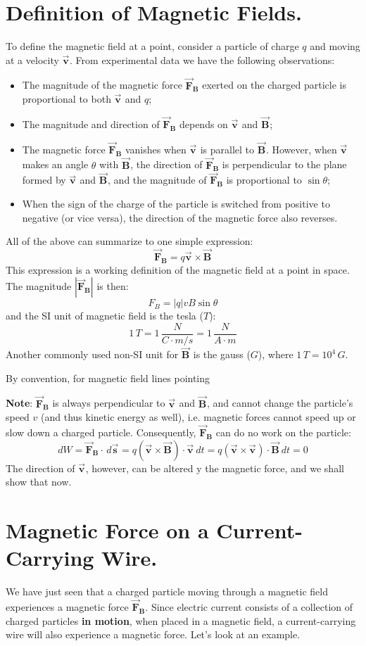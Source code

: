 \documentclass[11pt, letterpaper]{article}
\theoremstyle{definition}
\theoremstyle{remark}
\newcommand{\bv}[2][]{\bm{\vec{#2}_{#1}}}
\begin{document}
\section{Definition of Magnetic Fields.}
To define the magnetic field at a point, consider a particle of charge $q$ and moving at a velocity $\bv{v}$. From experimental data we have the following observations:
\begin{itemize}
	\item The magnitude of the magnetic force $\bv[B]{F}$ exerted on the charged particle is proportional to both $\bv{v}$ and $q$;
	\item The magnitude and direction of $\bv[B]{F}$ depends on $\bv{v}$ and $\bv{B}$;
	\item The magnetic force $\bv[B]{F}$ vanishes when $\bv{v}$ is parallel to $\bv{B}$. However, when $\bv{v}$ makes an angle $\theta$ with $\bv{B}$, the direction of $\bv[B]{F}$ is perpendicular to the plane formed by $\bv{v}$ and $\bv{B}$, and the magnitude of $\bv[B]{F}$ is proportional to $\sin{\theta}$;
	\item When the sign of the charge of the particle is switched from positive to negative (or vice versa), the direction of the magnetic force also reverses.
\end{itemize}
All of the above can summarize to one simple expression: 
\begin{equation}\label{eqn:magnetic-force}
	\boxed{\bv[B]{F} = q\bv{v}\times\bv{B}}
\end{equation}
This expression is a working definition of the magnetic field at a point in space. The magnitude $|\bv[B]{F}|$ is then: \[F_B = |q|vB\sin{\theta}\] and the SI unit of magnetic field is the tesla ($T$): \[1\, T = 1\,\frac{N}{C\cdot m/s} = 1\,\frac{N}{A\cdot m}\] Another commonly used non-SI unit for $\bv{B}$ is the gauss ($G$), where $1\, T = 10^4\,G$. 

By convention, for magnetic field lines pointing 

\textbf{Note}: $\bv[B]{F}$ is always perpendicular to $\bv{v}$ and $\bv{B}$, and cannot change the particle's speed $v$ (and thus kinetic energy as well), i.e. magnetic forces cannot speed up or slow down a charged particle. Consequently, $\bv[B]{F}$ can do no work on the particle: \[dW = \bv[B]{F}\cdot\, d\bv{s} = q(\bv{v}\times\bv{B})\cdot\bv{v}\, dt = q(\bv{v}\times\bv{v})\cdot\bv{B}\, dt = 0\] The direction of $\bv{v}$, however, can be altered y the magnetic force, and we shall show that now.

\section{Magnetic Force on a Current-Carrying Wire.}
We have just seen that a charged particle moving through a magnetic field experiences a magnetic force $\bv[B]{F}$. Since electric current consists of a collection of charged particles \textbf{in motion}, when placed in a magnetic field, a current-carrying wire will also experience a magnetic force. Let's look at an example. 
\end{document}
